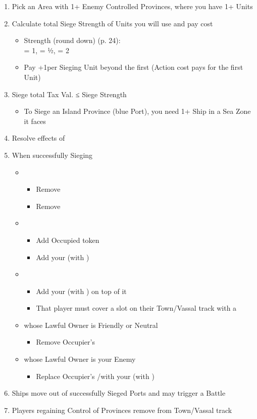\documentclass[10pt]{article}
\begin{document}
\begin{enumerate}
	\item Pick an Area with 1+ Enemy Controlled Provinces, where you have 1+ Units
	\item Calculate total Siege Strength of Units you will use and pay \milpower cost
	\begin{itemize}
		\item Strength (round down) (p. 24): \\
		\infantry = 1, \cavalry = ½, \artillery = 2 
		\item Pay +1\milpower per Sieging Unit beyond the first (Action cost pays for the first Unit)
	\end{itemize}
	\item Siege total Tax Val. ≤ Siege Strength
	\begin{itemize}
		\item To Siege an Island Province (blue Port), you need 1+ Ship in a Sea Zone it faces
	\end{itemize}
	\item Resolve effects of 
	\item When successfully Sieging
	\begin{itemize}
		\item {}
		\begin{itemize}
			\item Remove \rebeltown
			\item Remove \unrest
		\end{itemize}
		\item {}
		\begin{itemize}
			\item Add Occupied token
			\item Add your \town (with \unrest)
		\end{itemize}
		\item {}
		\begin{itemize}
			\item Add your \town (with \unrest) on top of it
			\item That player must cover a slot on their Town/Vassal track with a \cube
		\end{itemize}
		\item {} whose Lawful Owner is Friendly or Neutral
		\begin{itemize}
			\item Remove Occupier's \town
		\end{itemize}
		\item {} whose Lawful Owner is your Enemy
		\begin{itemize}
			\item Replace Occupier's \town/\rebeltown with your \town (with \unrest)
		\end{itemize}
	\end{itemize}
	\item Ships move out of successfully Sieged Ports and may trigger a Battle
	\item Players regaining Control of Provinces remove \cubes from Town/Vassal track
\end{enumerate}
\end{document}
